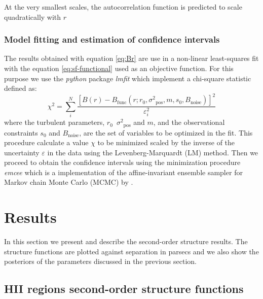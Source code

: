 \documentclass[fleqn,usenatbib, useAMS, a4paper]{mnras}
\newcommand\pos{\ensuremath{_{\mathrm{pos}}}}
\begin{document}
At the very smallest scales, the autocorrelation function is predicted to
scale quadratically with \(r\)

\subsubsection{Model fitting and estimation of confidence intervals}
\label{sec:model-fit}

The results obtained with equation \ref{eq:Br} are use in a non-linear least-squares fit with the equation \ref{eq:sf-functional} used as an objective function.
For this purpose we use the \textit{python} package \textit{lmfit} \citep{newville_matthew_2014_11813} which implement a chi-square statistic defined as:
%
%
%
\begin{equation}\label{eq:chi}
  \chi^2 = \sum_i ^N \frac{[B(r)-B_{\text{func}}(r;r_0, \sigma^2\pos, m, s_0, B_{\text{noise}})]^2}{\varepsilon_i ^2}
\end{equation}
%
where the turbulent parameters, \(r_{0}\)\, \(\sigma^2\pos\) and \(m\), and the observational constraints \(s_0\) and \( B_{\text{noise}}\), are the set of variables to be optimized in the fit.
This procedure calculate a value \(\chi\) to be minimized scaled by the inverse of the uncertainty \(\varepsilon\) in the data using the Levenberg-Marquardt (LM) method.
Then we proceed to obtain the confidence intervals using the minimization procedure \textit{emcee} \citep{2013PASP..125..306F} which is a implementation of the affine-invariant ensemble sampler for Markov chain Monte Carlo (MCMC) by \citet{2010CAMCS...5...65G}.

\section{Results}\label{sec:results}

In this section we present and describe the second-order structure results. The structure functions are plotted against separation in parsecs and we also show the posteriors of the parameters discussed in the previous section.

\subsection{HII regions second-order structure functions}
\end{document}
